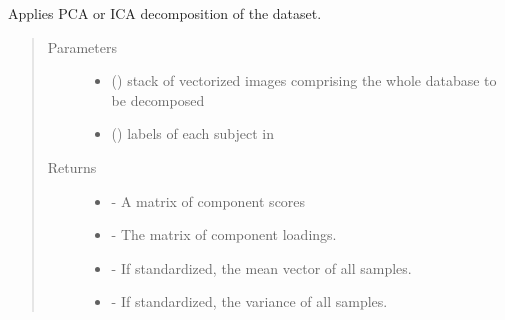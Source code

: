 \documentclass[letterpaper,10pt,english]{sphinxmanual}
\begin{document}
\begin{fulllineitems}
\begin{fulllineitems}
\begin{quote}
\begin{description}
\end{description}\end{quote}

\end{fulllineitems}


\begin{fulllineitems}
\label{\detokenize{api:brainSimulator.BrainSimulator.decompose}}
Applies PCA or ICA decomposition of the dataset.
\begin{quote}\begin{description}
\item[{Parameters}] \leavevmode\begin{itemize}
\item {} 
 () \textendash{} stack of vectorized images comprising the whole database to be decomposed

\item {} 
 () \textendash{} labels of each subject in 

\end{itemize}

\item[{Returns}] \leavevmode
\begin{itemize}
\item {} 
 - A matrix of component scores

\item {} 
 - The matrix of component loadings.

\item {} 
 - If standardized, the mean vector of all samples.

\item {} 
 - If standardized, the variance of all samples.

\end{itemize}


\end{description}\end{quote}

\end{fulllineitems}


\end{fulllineitems}
\end{document}
